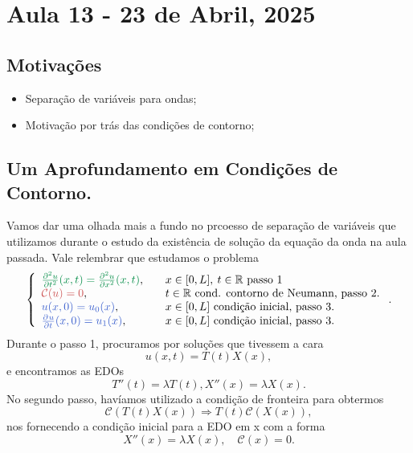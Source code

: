 \documentclass[../pde_notes.tex]{subfiles}
\begin{document}
\section{Aula 13 - 23 de Abril, 2025}
\subsection{Motivações}
\begin{itemize}
	\item Separação de variáveis para ondas;
	\item Motivação por trás das condições de contorno;
\end{itemize}
\subsection{Um Aprofundamento em Condições de Contorno.}
Vamos dar uma olhada mais a fundo no prcoesso de separação de variáveis que utilizamos durante o estudo da existência de solução da equação da onda na aula passada. Vale relembrar que estudamos o problema
\[
	\left\{\begin{array}{ll}
		{\color{SpringGreen4}\frac{\partial^{2}u}{\partial t^{2}}(x, t)=\frac{\partial^{2}u}{\partial x^{2}}(x, t)}, & \quad x\in [0, L],\: t\in \mathbb{R} \text{ passo 1}              \\
		{\color{IndianRed3}\mathcal{C}(u)=0},                                                                        & \quad t\in \mathbb{R} \text{ cond. contorno de Neumann, passo 2.} \\
		{\color{RoyalBlue3}u(x,0)=u_{0}(x)},                                                                         & \quad  x\in [0, L]     \text{ condição inicial, passo 3.}         \\
		{\color{RoyalBlue3}\frac{\partial^{}u}{\partial t^{}}(x,0)=u_{1}(x)},                                        & \quad  x\in [0, L]\text{ condição inicial, passo 3.}
	\end{array}\right..
\]
Durante o {\color{SpringGreen4} passo 1}, procuramos por soluções que tivessem a cara
\[
	u(x, t) = T(t)X(x),
\]
e encontramos as EDOs
\[
	T''(t) = \lambda T(t), X''(x) = \lambda X(x).
\]
No segundo passo, havíamos utilizado a condição de fronteira para obtermos
\[
	\mathcal{C}(T(t)X(x)) \Rightarrow T(t)\mathcal{C}(X(x)),
\]
nos fornecendo a condição inicial para a EDO em x com a forma
\[
	X''(x) = \lambda X(x),\quad \mathcal{C}(x) = 0.
\]
\end{document}
